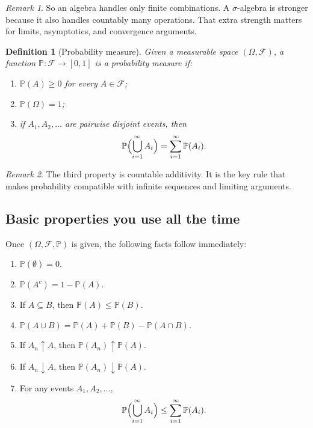 \documentclass[11pt]{article}
\newtheorem{definition}{Definition}[section]
\theoremstyle{remark}
\newtheorem{remark}{Remark}[section]
\newcommand{\PP}{\mathbb{P}}
\newcommand{\1}{\mathbbm{1}}
\newcommand{\cF}{\mathcal{F}}
\begin{document}
\begin{remark}
So an algebra handles only finite combinations. A \(\sigma\)-algebra is stronger because it also handles countably many operations. That extra strength matters for limits, asymptotics, and convergence arguments.
\end{remark}

\begin{definition}[Probability measure]
Given a measurable space \((\Omega,\cF)\), a function \(\PP : \cF \to [0,1]\) is a \emph{probability measure} if:
\begin{enumerate}[label=(\roman*)]
  \item \(\PP(A) \ge 0\) for every \(A \in \cF\);
  \item \(\PP(\Omega) = 1\);
  \item if \(A_1,A_2,\dots\) are pairwise disjoint events, then
  \[
    \PP\Bigl(\bigcup_{i=1}^{\infty} A_i\Bigr) = \sum_{i=1}^{\infty}\PP(A_i).
  \]
\end{enumerate}
\end{definition}

\begin{remark}
The third property is countable additivity. It is the key rule that makes probability compatible with infinite sequences and limiting arguments.
\end{remark}

\subsection{Basic properties you use all the time}

Once \((\Omega,\cF,\PP)\) is given, the following facts follow immediately:

\begin{enumerate}[label=(\alph*)]
  \item \(\PP(\emptyset)=0\).
  \item \(\PP(A^c)=1-\PP(A)\).
  \item If \(A \subseteq B\), then \(\PP(A)\le \PP(B)\).
  \item \(\PP(A\cup B)=\PP(A)+\PP(B)-\PP(A\cap B)\).
  \item If \(A_n \uparrow A\), then \(\PP(A_n)\uparrow \PP(A)\).
  \item If \(A_n \downarrow A\), then \(\PP(A_n)\downarrow \PP(A)\).
  \item For any events \(A_1,A_2,\dots\),
  \[
    \PP\Bigl(\bigcup_{i=1}^{\infty} A_i\Bigr)\le \sum_{i=1}^{\infty}\PP(A_i).
  \]
\end{enumerate}
\end{document}
